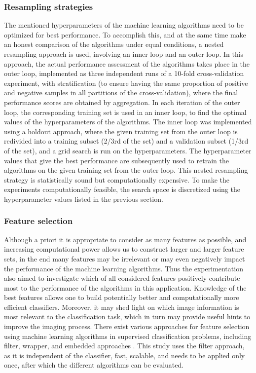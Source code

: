 \subsubsection{Resampling strategies}
\label{subsubsec:resampling}
The mentioned hyperparameters of the machine learning algorithms need to be optimized for best performance. To accomplish this, and at the same time make an honest comparison of the algorithms under equal conditions, a nested resampling approach \cite{simon2007resampling, bischl2012resampling} is used, involving an inner loop and an outer loop. In this approach, the actual performance assessment of the algorithms takes place in the outer loop, implemented as three independent runs of a 10-fold cross-validation experiment, with stratification (to ensure having the same proportion of positive and negative samples in all partitions of the cross-validation), where the final performance scores are obtained by aggregation. In each iteration of the outer loop, the corresponding training set is used in an inner loop, to find the optimal values of the hyperparameters of the algorithms. The inner loop was implemented using a holdout approach, where the given training set from the outer loop is redivided into a training subset (2/3rd of the set) and a validation subset (1/3rd of the set), and a grid search is run on the hyperparameters. The hyperparameter values that give the best performance are subsequently used to retrain the algorithms on the given training set from the outer loop. This nested resampling strategy is statistically sound but computationally expensive. To make the experiments computationally feasible, the search space is discretized using the hyperparameter values listed in the previous section.

\subsubsection{Feature selection}
\label{subsubsec:featureSelection}
Although a priori it is appropriate to consider as many features as possible, and increasing  computational power allows us to construct larger and larger feature sets, in the end many features may be irrelevant or may even negatively impact the performance of the machine learning algorithms. Thus the experimentation also aimed to investigate which of all considered features positively contribute most to the performance of the algorithms in this application. Knowledge of the best features allows one to build potentially better and computationally more efficient classifiers. Moreover, it may shed light on which image information is most relevant to the classification task, which in turn may provide useful hints to improve the imaging process. There exist various approaches for feature selection using machine learning algorithms in supervised classification problems, including filter, wrapper, and embedded approaches \cite{saeys2007review}. This study uses the filter approach, as it is independent of the classifier, fast, scalable, and needs to be applied only once, after which the different algorithms can be evaluated.
